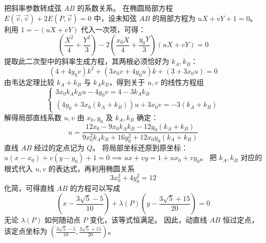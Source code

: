 \begin{solution}
把斜率参数转成弦 $AB$ 的系数关系。
在椭圆局部方程 $E(\vec{v}, \vec{v}) + 2E(P, \vec{v}) = 0$ 中，设未知弦 $AB$ 的局部方程为 $uX + vY + 1 = 0$。利用 $1 = -(uX + vY)$ 代入一次项，可得：
$$ \left(\frac{X^2}{4} + \frac{Y^2}{3}\right) - 2\left(\frac{x_0 X}{4} + \frac{y_0 Y}{3}\right)(uX + vY) = 0 $$
提取此二次型中的斜率生成方程，其两根必须恰好为 $k_A, k_B$：
$$ (4 + 4y_0 v) k^2 + (3x_0 v + 4y_0 u) k + (3 + 3x_0 u) = 0 $$
由韦达定理比较 $k_A + k_B$ 与 $k_A k_B$，得到关于 $u,v$ 的线性方程组
\[
\begin{cases}
3x_0 k_A k_B u - 4y_0 v = 4 - 3k_A k_B \\
(4y_0 + 3x_0(k_A + k_B))u + 3x_0 v = -3(k_A + k_B)
\end{cases}
\]
解得局部直线系数 $u, v$ 由 $x_0, y_0$ 及 $k_A, k_B$ 确定：
$$ u = \frac{12x_0 - 9x_0 k_A k_B - 12y_0(k_A+k_B)}{9x_0^2 k_A k_B + 16y_0^2 + 12x_0 y_0(k_A+k_B)} $$
直线 $AB$ 经过的定点记为 $Q$。
将局部坐标还原到原坐标：$u(x-x_0) + v(y-y_0) + 1 = 0 \implies ux + vy = 1 + ux_0 + vy_0$。
把 $k_A,k_B$ 对应的根式代入 $u,v$ 的表达式，再利用椭圆关系
$$3x_0^2 + 4y_0^2 = 12$$
化简，可得直线 $AB$ 的方程可以写成
$$ \left(x - \frac{3\sqrt{5}-5}{10}\right) + \lambda(P) \left(y - \frac{3\sqrt{5}+15}{20}\right) = 0 $$
无论 $\lambda(P)$ 如何随动点 $P$ 变化，该等式恒满足。
因此，动直线 $AB$ 恒过定点，该定点坐标为 $\left( \frac{3\sqrt{5}-5}{10}, \frac{3\sqrt{5}+15}{20} \right)$。
\end{solution}

